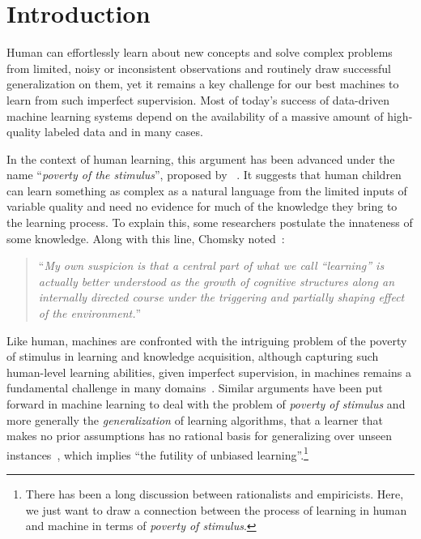 \chapter{Introduction}
Human can effortlessly learn about new concepts and solve complex problems from limited, noisy or inconsistent observations and routinely draw successful generalization on them, yet it remains a key challenge for our best machines to learn from such imperfect supervision. Most of today's success of data-driven machine learning systems depend on the availability of a massive amount of high-quality labeled data and in many cases.

In the context of human learning, this argument has been advanced under the name ``\emph{poverty of the stimulus}'', proposed by ~\citet{chomsky1980rules}. It suggests that human children can learn something as complex as a natural language from the limited inputs of variable quality and need no evidence for much of the knowledge they bring to the learning process. 
To explain this, some researchers postulate the innateness of some knowledge.
Along with this line, Chomsky noted~\citep{chomsky1980rules}:
\begin{quote}
    ``\emph{My own suspicion is that a central part of what we call “learning” is actually better understood as the growth of cognitive structures along an internally directed course under the triggering and partially shaping effect of the environment.}''
\end{quote}

Like human, machines are confronted with the intriguing problem of the poverty of stimulus in learning and knowledge acquisition, although capturing such human-level learning abilities, given imperfect supervision, in machines remains a fundamental challenge in many domains~\citep{lake2017building}. 
%
Similar arguments have been put forward in machine learning to deal with the problem of \emph{poverty of stimulus} and more generally the \emph{generalization} of learning algorithms, that a learner that makes no prior assumptions has no rational basis for generalizing over unseen instances~\citep{Mitchell:1997:ML}, which implies ``the futility of unbiased learning''.\footnote{There has been a long discussion between rationalists and empiricists. Here, we just want to draw a connection between the process of learning in human and machine in terms of \emph{poverty of stimulus}.}

